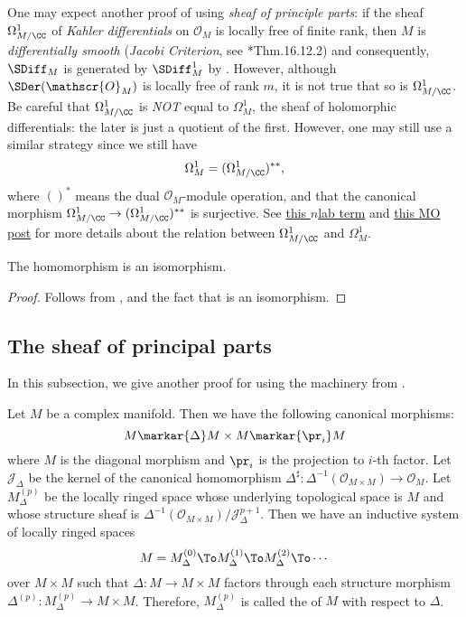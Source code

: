 \begin{Rem}
\small
One may expect another proof of  
using \emph{sheaf of principle parts}: 
if the sheaf $\Omega_{M/\CC}^1$ of \emph{Kahler differentials} 
on $\mathscr{O}_M$ is locally free of finite rank, 
then $M$ is \emph{differentially smooth} (\emph{Jacobi Criterion}, 
see \cite{EGA4}*{Thm.16.12.2}) and
consequently, $\SDiff_M$ is generated by $\SDiff_M^1$ by \cite[Thm.16.11.2]{EGA4}.
However, although $\SDer(\mathscr{O}_M)$ is locally free of rank $m$, 
it is not true that so is $\Omega_{M/\CC}^1$. 
Be careful that $\Omega_{M/\CC}^1$ is \emph{NOT} equal to $\Omega_{M}^1$, 
the sheaf of holomorphic differentials: 
the later is just a quotient of the first.
However, one may still use a similar strategy since we still have
\[
\Omega_{M}^1=(\Omega_{M/\CC}^1)^{\ast\ast},
\]
where $()^\ast$ means the dual $\mathscr{O}_M$-module operation, and 
that the canonical morphism $\Omega_{M/\CC}^1\to(\Omega_{M/\CC}^1)^{\ast\ast}$ 
is surjective. 
See \href{https://ncatlab.org/nlab/show/Kahler+differential#SmoothOrPlain}
{this $n$lab term} and 
\href{https://mathoverflow.net/questions/6074/kahler-differentials-and-ordinary-differentials}{this MO post} 
for more details about the relation between $\Omega_{M/\CC}^1$ and $\Omega_{M}^1$.
\end{Rem}

\begin{cor}
The homomorphism  is an isomorphism.
\end{cor}
\begin{proof}
Follows from ,  
and the fact that  is an isomorphism.
\end{proof}

\subsection{The sheaf of principal parts}
In this subsection, we give another proof for  using the machinery from \cite{TCGA}.

Let $M$ be a complex manifold. 
Then we have the following canonical morphisms:
\[
M\markar{\Delta}M\times M\markar{\pr_i}M
\]
where $M$ is the diagonal morphism and $\pr_i$ is the projection to $i$-th factor.
Let $\mathscr{J}_\Delta$ be the kernel of the canonical homomorphism 
$\Delta^\sharp\colon\Delta^{-1}(\mathscr{O}_{M\times M})\to\mathscr{O}_M$. 
Let $M_\Delta^{(p)}$ be the locally ringed space 
whose underlying topological space is $M$ and whose structure sheaf is 
$\Delta^{-1}(\mathscr{O}_{M\times M})/\mathscr{J}_\Delta^{p+1}$. 
Then we have an inductive system of locally ringed spaces
\[
M=M_\Delta^{(0)}\To M_\Delta^{(1)}\To M_\Delta^{(2)}\To\cdots
\]
over $M\times M$ such that $\Delta\colon M\to M\times M$ factors through 
each structure morphism $\Delta^{(p)}\colon M_\Delta^{(p)}\to M\times M$. 
Therefore, $M_\Delta^{(p)}$ is called the 
 of $M$ with respect to $\Delta$. 

